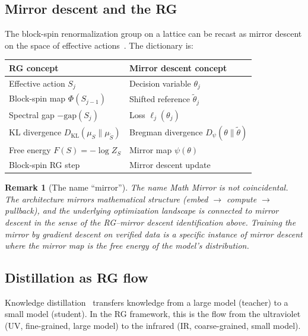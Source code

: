 \documentclass[11pt,a4paper]{article}
\newtheorem{remark}[theorem]{Remark}
\newcommand{\DKL}{D_{\mathrm{KL}}}
\newcommand{\Breg}{D_\psi}
\begin{document}
\subsection{Mirror descent and the RG}

The block-spin renormalization group on a lattice can be
recast as mirror descent on the space of effective
actions~\cite{Zhang2026YM}.
The dictionary is:

\begin{center}
\small
\renewcommand{\arraystretch}{1.1}
\begin{tabular}{@{}ll@{}}
\toprule
\textbf{RG concept} & \textbf{Mirror descent concept} \\
\midrule
Effective action $S_j$ & Decision variable $\theta_j$ \\
Block-spin map $\Phi(S_{j-1})$ & Shifted reference $\tilde\theta_j$ \\
Spectral gap $-\text{gap}(S_j)$ & Loss $\ell_j(\theta_j)$ \\
KL divergence $\DKL(\mu_S \| \mu_{\tilde S})$ &
  Bregman divergence $\Breg(\theta \| \tilde\theta)$ \\
Free energy $F(S) = -\log Z_S$ & Mirror map $\psi(\theta)$ \\
Block-spin RG step & Mirror descent update \\
\bottomrule
\end{tabular}
\end{center}

\begin{remark}[The name ``mirror'']
The name \emph{Math Mirror} is not coincidental.
The architecture mirrors mathematical structure
(embed $\to$ compute $\to$ pullback),
and the underlying optimization landscape is
connected to mirror descent in the sense of the
RG--mirror descent identification above.
Training the mirror by gradient descent on verified data
is a specific instance of mirror descent where the
mirror map is the free energy of the model's distribution.
\end{remark}

\subsection{Distillation as RG flow}

Knowledge distillation~\cite{Hinton2015} transfers knowledge
from a large model (teacher) to a small model (student).
In the RG framework, this is the flow from the ultraviolet
(UV, fine-grained, large model) to the infrared
(IR, coarse-grained, small model).
\end{document}
